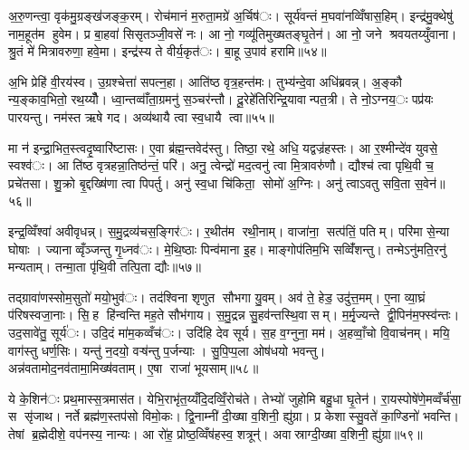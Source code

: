 अ॒रु॒णन्त्वा॒ वृक॑मु॒ग्रङ्ख॑जङ्क॒रम्। रोच॑मानं म॒रुता॒मग्रे॑ अ॒र्चिष॑ः। सूर्य॑वन्तं म॒घवा॑नव्विँषास॒हिम्। इन्द्र॑मु॒क्थेषु॑ नाम॒हूत॑म हुवेम। प्र बा॒हवा॑ सिसृतञ्जी॒वसे॑ नः। आ नो॒ गव्यू॑तिमुख्षतङ्घृ॒तेन॑। आ नो॒ जने श्रवयतय्युँवाना। श्रु॒तं मे॑ मित्रावरुणा॒ हवे॒मा। इन्द्र॑स्य ते वीर्य॒कृत॑ः। बा॒हू उ॒पाव॑ हरामि॥५४॥


अ॒भि प्रेहि॑ वी॒रय॑स्व। उ॒ग्रश्चेत्ता॑ सपत्न॒हा। आति॑ष्ठ वृत्र॒हन्त॑मः। तुभ्य॑न्दे॒वा अधि॑ब्रवन्न्। अ॒ङ्कौ न्य॒ङ्काव॒भितो॒ रथ॒य्यौँ। ध्वा॒न्तव्वाँ॑ता॒ग्रमनु॑ स॒ञ्चर॑न्तौ। दू॒रेहे॑तिरिन्द्रि॒यावान्पत॒त्री। ते नो॒ऽग्नय॒ः पप्र॑यः पारयन्तु। नम॑स्त ऋषे गद। अव्य॑थायै त्वा स्व॒धायै त्वा॥५५॥

मा न॑ इन्द्रा॒भित॒स्त्वदृ॒ष्वारि॑ष्टासः। ए॒वा ब्र॑ह्म॒न्तवेद॑स्तु। तिष्ठा॒ रथे॒ अधि॒ यद्वज्र॑हस्तः। आ र॒श्मीन्दे॑व युवसे॒ स्वश्व॑ः। आ ति॑ष्ठ वृत्रहन्ना॒तिष्ठ॑न्तं॒ परि॑। अनु॒ त्वेन्द्रो॑ मद॒त्वनु॑ त्वा मि॒त्रावरु॑णौ। द्यौश्च॑ त्वा पृथि॒वी च॒ प्रचे॑तसा। शु॒क्रो बृ॒द्दख्षि॑णा त्वा पिपर्तु। अनु॑ स्व॒धा चि॑किता॒ सोमो॑ अ॒ग्निः। अनु॑ त्वाऽवतु सवि॒ता स॒वेन॑॥५६॥

इन्द्र॒व्विँश्वा॑ अवीवृधन्न्। स॒मु॒द्रव्य॑चस॒ङ्गिर॑ः। र॒थीत॑म रथी॒नाम्। वाजा॑ना॒ सत्प॑तिं॒ पतिम्। परि॑मा से॒न्या घोषाः। ज्यानाव्वृँञ्जन्तु गृ॒ध्नव॑ः। मे॒थि॒ष्ठाः पिन्व॑माना इ॒ह। माङ्गोप॑तिम॒भि सव्विँ॑शन्तु। तन्मेऽनु॑मति॒रनु॑ मन्यताम्। तन्मा॒ता पृ॑थि॒वी तत्पि॒ता द्यौः॥५७॥

तद्ग्रावा॑णस्सोम॒सुतो॑ मयो॒भुव॑ः। तद॑श्विना शृणुत सौभगा यु॒वम्। अव॑ ते॒ हेड॒ उदु॑त्त॒मम्। ए॒ना व्या॒घ्रं प॑रिषस्वजा॒नाः। सि॒ह हि॑न्वन्ति मह॒ते सौभ॑गाय। स॒मु॒द्रन्न सु॒हव॑न्तस्थि॒वासम्। म॒र्मृ॒ज्यन्ते द्वी॒पिन॑म॒फ्स्व॑न्तः। उद॒सावे॑तु॒ सूर्य॑ः। उदि॒दं मा॑म॒कव्वँच॑ः। उदि॑हि देव सूर्य। स॒ह व॒ग्नुना॒ मम॑। अ॒हव्वाँ॒चो वि॒वाच॑नम्। मयि॒ वाग॑स्तु धर्ण॒सिः। यन्तु॑ न॒दयो॒ वऱ्ष॑न्तु प॒र्जन्याः। सु॒पि॒प्प॒ला ओष॑धयो भवन्तु। अन्न॑वतामोद॒नव॑तामा॒मिख्ष॑वताम्। ए॒षा राजा॑ भूयसाम्॥५८॥


ये के॒शिन॑ः प्रथ॒मास्स॒त्रमास॑त। येभि॒राभृ॑त॒य्यँदि॒दव्विँ॒रोच॑ते। तेभ्यो॑ जुहोमि बहु॒धा घृ॒तेन॑। रा॒यस्पोषे॑णे॒मव्वँर्च॑सा॒ स सृ॑जाथ। नर्ते ब्रह्म॑ण॒स्तप॑सो विमो॒कः। द्वि॒नाम्नी॑ दी॒ख्षा व॒शिनी॒ ह्यु॑ग्रा। प्र केशास्सु॒वते॑ का॒ण्डिनो॑ भवन्ति। तेषां ब्र॒ह्मेदीशे॒ वप॑नस्य॒ नान्यः। आ रो॑ह॒ प्रोष्ठ॒व्विँष॑हस्व॒ शत्रून्॑। अवास्राग्दी॒ख्षा व॒शिनी॒ ह्यु॑ग्रा॥५९॥

